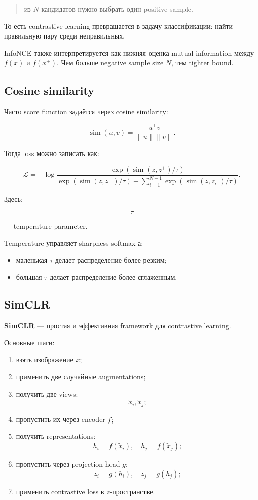 \documentclass[a4paper,12pt]{article}
\begin{document}
\begin{quote}
из \(N\) кандидатов нужно выбрать один positive sample.
\end{quote}

То есть contrastive learning превращается в задачу классификации: найти правильную пару среди неправильных.

InfoNCE также интерпретируется как нижняя оценка mutual information между \(f(x)\) и \(f(x^+)\). Чем больше negative sample size \(N\), тем tighter bound.

\subsection{Cosine similarity}

Часто score function задаётся через cosine similarity:

\[
\operatorname{sim}(u,v)
=
\frac{u^\top v}{\|u\|\|v\|}.
\]

Тогда loss можно записать как:

\[
\mathcal{L}
=
-
\log
\frac{
\exp(\operatorname{sim}(z,z^+)/\tau)
}{
\exp(\operatorname{sim}(z,z^+)/\tau)
+
\sum_{i=1}^{N-1}
\exp(\operatorname{sim}(z,z_i^-)/\tau)
}.
\]

Здесь:

\[
\tau
\]

--- temperature parameter.

Temperature управляет sharpness softmax-а:

\begin{itemize}
    \item маленькая \(\tau\) делает распределение более резким;
    \item большая \(\tau\) делает распределение более сглаженным.
\end{itemize}

\subsection{SimCLR}

\textbf{SimCLR} --- простая и эффективная framework для contrastive learning.

Основные шаги:

\begin{enumerate}
    \item взять изображение \(x\);
    \item применить две случайные augmentations;
    \item получить две views:
    \[
    \tilde{x}_i, \tilde{x}_j;
    \]
    \item пропустить их через encoder \(f\);
    \item получить representations:
    \[
    h_i = f(\tilde{x}_i), \quad h_j = f(\tilde{x}_j);
    \]
    \item пропустить через projection head \(g\):
    \[
    z_i = g(h_i), \quad z_j = g(h_j);
    \]
    \item применить contrastive loss в \(z\)-пространстве.
\end{enumerate}
\end{document}
